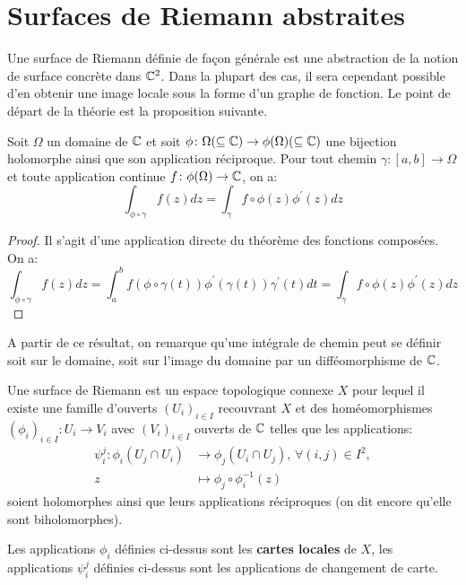 \section{Surfaces de Riemann abstraites}
Une surface de Riemann définie de façon générale est une abstraction de la notion de surface concrète dans $\mathbb{C}^2$. Dans la plupart des cas, il sera cependant possible d'en obtenir une image locale sous la forme d'un graphe de fonction. Le point de départ de la théorie est la proposition suivante.
\begin{prop}
	\label{prop:chg_var}
	Soit $\Omega$ un domaine de $\mathbb{C}$ et soit $\phi \colon \Omega ( \subseteq \mathbb{C}) \to \phi(\Omega) (\subseteq \mathbb{C})$ une bijection holomorphe ainsi que son application réciproque. Pour tout chemin $\gamma \colon [a,b] \to \Omega$ et toute application continue $f \colon \phi(\Omega) \to \mathbb{C}$, on a:
	\[
	\int_{\phi \circ \gamma} f(z)dz = \int_\gamma f \circ \phi(z) \phi^\prime(z)dz
	\]
\end{prop}
\begin{proof}
	Il s'agit d'une application directe du théorème des fonctions composées. On a:
	\[
	\int_{\phi \circ \gamma} f(z)dz = \int_a^b f\left(\phi \circ \gamma(t)\right)\phi^\prime(\gamma(t)) \gamma^\prime(t) dt = \int_\gamma f \circ \phi(z) \phi^\prime(z)dz
	\]
\end{proof}
A partir de ce résultat, on remarque qu'une intégrale de chemin peut se définir soit sur le domaine, soit sur l'image du domaine par un difféomorphisme de $\mathbb{C}$.
\begin{fdefn}
	Une surface de Riemann est un espace topologique connexe $X$ pour lequel il existe une famille d'ouverts $(U_i)_{i \in I}$ recouvrant $X$ et des homéomorphismes $(\phi_i)_{i \in I} \colon U_i \to V_i$ avec $(V_i)_{i \in I}$ ouverts de $\mathbb{C}$ telles que les applications:
	\begin{align*}
	    \psi_i^j \colon \phi_i (U_j\cap U_i) & \longrightarrow  \phi_j (U_i\cap U_j), \,  \forall(i,j) \in I^2, \\
	    z  & \longmapsto \phi_j\circ \phi_i^{-1}(z)
	\end{align*}
	soient holomorphes ainsi que leurs applications réciproques (on dit encore qu'elle sont biholomorphes).
\end{fdefn}
\begin{defn}
Les applications  $\phi_i$ définies ci-dessus sont les \textbf{cartes locales} de $X$, les applications $\psi_i^j$ définies ci-dessus sont les applications de changement de carte.
\end{defn}
